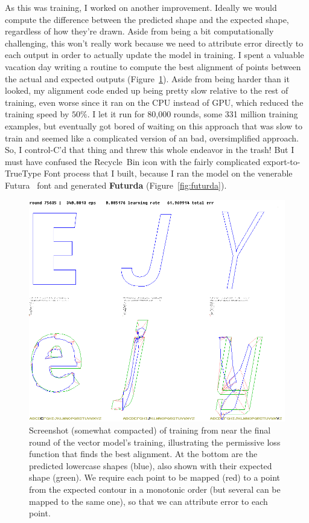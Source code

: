 \documentclass[twocolumn]{article}
\begin{document}
As this was training, I worked on another improvement. Ideally we
would compute the difference between the predicted shape and the
expected shape, regardless of how they're drawn. Aside from being a
bit computationally challenging, this won't really work because we
need to attribute error directly to each output in order to actually
update the model in training. I spent a valuable vacation day writing
a routine to compute the best alignment of points between the actual
and expected outputs (Figure~\ref{fig:trainingrotate}). Aside from being
harder than it looked, my alignment code ended up being pretty slow
relative to the rest of training, even worse since it ran on the CPU
instead of GPU, which reduced the training speed by $50\%$. I let it
run for 80,000 rounds, some 331 million training examples, but
eventually got bored of waiting on this approach that was slow to
train and seemed like a complicated version of an bad, oversimplified
approach. So, I control-C'd that thing and threw this whole endeavor
in the trash! But I must have confused the Recycle~Bin icon with the
fairly complicated export-to-TrueType Font process that I built,
because I ran the model on the venerable Futura~\cite{futura} font and
generated {\bf Futurda} (Figure~\ref{fig:futurda}).

\begin{figure}[ht]
\centering
  \includegraphics[width=0.95 \linewidth]{trainingrotate}
\caption{ Screenshot (somewhat compacted) of training from near the
  final round of the vector model's training, illustrating the
  permissive loss function that finds the best alignment. At the bottom are
  the predicted lowercase shapes (blue), also shown with their
  expected shape (green). We require each point to be mapped (red)
  to a point from the expected contour in a monotonic order (but
  several can be mapped to the same one), so that we can attribute
  error to each point.
} \label{fig:trainingrotate}
\end{figure}
\end{document}
